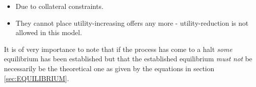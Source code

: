\documentclass[../Bachelorarbeit.tex]{subfiles}
\begin{document}
\begin{itemize}
\item Due to collateral constraints.
\item They cannot place utility-increasing offers any more - utility-reduction is not allowed in this model.
\end{itemize}

It is of very importance to note that if the process has come to a halt \textit{some} equilibrium has been established but that the established equilibrium \textit{must not} be necessarily be the theoretical one as given by the equations in section \ref{sec:EQUILIBRIUM}.
\end{document}
